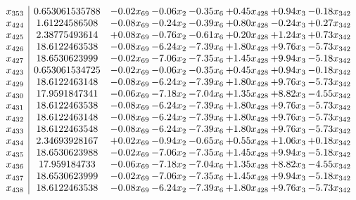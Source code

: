\documentclass[8pt]{article}
\begin{document}
\[\begin{array}{c| c c@{\hskip 2pt} c@{\hskip 2pt} c@{\hskip 2pt} c@{\hskip 2pt} c@{\hskip 2pt} c@{\hskip 2pt} }
 x_{353}   &  0.653061535788 & -0.02 x_{69} & -0.06 x_{2} & -0.35 x_{6} & +  0.45 x_{428} & +  0.94 x_{3} & -0.18 x_{342}\\
 x_{424}   &  1.61224586508 & -0.08 x_{69} & -0.24 x_{2} & -0.39 x_{6} & +  0.80 x_{428} & -0.24 x_{3} & +  0.27 x_{342}\\
 x_{425}   &  2.38775493614 & +  0.08 x_{69} & -0.76 x_{2} & -0.61 x_{6} & +  0.20 x_{428} & +  1.24 x_{3} & +  0.73 x_{342}\\
 x_{426}   &  18.6122463538 & -0.08 x_{69} & -6.24 x_{2} & -7.39 x_{6} & +  1.80 x_{428} & +  9.76 x_{3} & -5.73 x_{342}\\
 x_{427}   &  18.6530623999 & -0.02 x_{69} & -7.06 x_{2} & -7.35 x_{6} & +  1.45 x_{428} & +  9.94 x_{3} & -5.18 x_{342}\\
 x_{423}   &  0.653061534725 & -0.02 x_{69} & -0.06 x_{2} & -0.35 x_{6} & +  0.45 x_{428} & +  0.94 x_{3} & -0.18 x_{342}\\
 x_{429}   &  18.6122463148 & -0.08 x_{69} & -6.24 x_{2} & -7.39 x_{6} & +  1.80 x_{428} & +  9.76 x_{3} & -5.73 x_{342}\\
 x_{430}   &  17.9591847341 & -0.06 x_{69} & -7.18 x_{2} & -7.04 x_{6} & +  1.35 x_{428} & +  8.82 x_{3} & -4.55 x_{342}\\
 x_{431}   &  18.6122463538 & -0.08 x_{69} & -6.24 x_{2} & -7.39 x_{6} & +  1.80 x_{428} & +  9.76 x_{3} & -5.73 x_{342}\\
 x_{432}   &  18.6122463148 & -0.08 x_{69} & -6.24 x_{2} & -7.39 x_{6} & +  1.80 x_{428} & +  9.76 x_{3} & -5.73 x_{342}\\
 x_{433}   &  18.6122463548 & -0.08 x_{69} & -6.24 x_{2} & -7.39 x_{6} & +  1.80 x_{428} & +  9.76 x_{3} & -5.73 x_{342}\\
 x_{434}   &  2.34693928167 & +  0.02 x_{69} & -0.94 x_{2} & -0.65 x_{6} & +  0.55 x_{428} & +  1.06 x_{3} & +  0.18 x_{342}\\
 x_{435}   &  18.6530623988 & -0.02 x_{69} & -7.06 x_{2} & -7.35 x_{6} & +  1.45 x_{428} & +  9.94 x_{3} & -5.18 x_{342}\\
 x_{436}   &  17.959184733 & -0.06 x_{69} & -7.18 x_{2} & -7.04 x_{6} & +  1.35 x_{428} & +  8.82 x_{3} & -4.55 x_{342}\\
 x_{437}   &  18.6530623999 & -0.02 x_{69} & -7.06 x_{2} & -7.35 x_{6} & +  1.45 x_{428} & +  9.94 x_{3} & -5.18 x_{342}\\
 x_{438}   &  18.6122463538 & -0.08 x_{69} & -6.24 x_{2} & -7.39 x_{6} & +  1.80 x_{428} & +  9.76 x_{3} & -5.73 x_{342}\\

\end{array}\]
\end{document}
